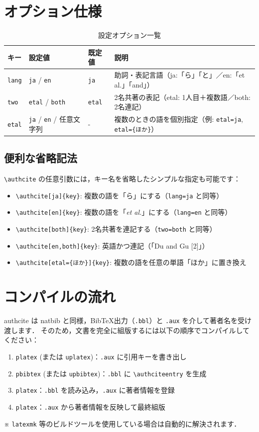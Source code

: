 \section{オプション仕様}
\begin{table}[htbp]
\centering
\caption{設定オプション一覧}
\begin{tabular}{llll}
\hline
キー & 設定値 & 既定値 & 説明 \\
\hline
\texttt{lang} & \texttt{ja} / \texttt{en} & \texttt{ja} & 助詞・表記言語（ja:「ら」「と」／en:「et al.」「and」） \\
\texttt{two}  & \texttt{etal} / \texttt{both} & \texttt{etal} & 2名共著の表記（etal: 1人目＋複数語／both: 2名連記） \\
\texttt{etal} & \texttt{ja} / \texttt{en} / 任意文字列 & - & 複数のときの語を個別指定（例: \texttt{etal=ja}, \texttt{etal=\{ほか\}}） \\
\hline
\end{tabular}
\end{table}

\subsection{便利な省略記法}
\verb|\authcite| の任意引数には，キー名を省略したシンプルな指定も可能です：
\begin{itemize}
  \item \verb|\authcite[ja]{key}|: 複数の語を「ら」にする（\texttt{lang=ja} と同等）
  \item \verb|\authcite[en]{key}|: 複数の語を「\textit{et al.}」にする（\texttt{lang=en} と同等）
  \item \verb|\authcite[both]{key}|: 2名共著を連記する（\texttt{two=both} と同等）
  \item \verb|\authcite[en,both]{key}|: 英語かつ連記（「Du and Gu [2]」）
  \item \verb|\authcite[etal={ほか}]{key}|: 複数の語を任意の単語「ほか」に置き換え
\end{itemize}

\section{コンパイルの流れ}
\textsf{authcite} は \textsf{natbib} と同様，Bib\TeX 出力（\texttt{.bbl}）と \texttt{.aux} を介して著者名を受け渡します．
そのため，文書を完全に組版するには以下の順序でコンパイルしてください：
\begin{enumerate}
  \item \texttt{platex} (または \texttt{uplatex})：\texttt{.aux} に引用キーを書き出し
  \item \texttt{pbibtex} (または \texttt{upbibtex})：\texttt{.bbl} に \verb|\authciteentry| を生成
  \item \texttt{platex}：\texttt{.bbl} を読み込み，\texttt{.aux} に著者情報を登録
  \item \texttt{platex}：\texttt{.aux} から著者情報を反映して最終組版
\end{enumerate}
※ \texttt{latexmk} 等のビルドツールを使用している場合は自動的に解決されます．






